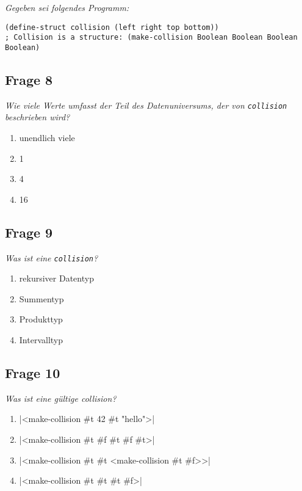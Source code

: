 \documentclass[a4paper, 11pt]{article}
\begin{document}
\begin{mdframed}
	\noindent\textit{Gegeben sei folgendes Programm:}
	\begin{verbatim}
(define-struct collision (left right top bottom))
; Collision is a structure: (make-collision Boolean Boolean Boolean Boolean)
\end{verbatim}

	\subsection*{Frage 8}
	\textit{Wie viele Werte umfasst der Teil des Datenuniversums, der von \texttt{collision} beschrieben wird?}
	\begin{enumerate}[label=$\square$]
		\item unendlich viele
		\item 1
		\item 4
		\item 16
	\end{enumerate}

	\subsection*{Frage 9}
	\textit{Was ist eine \texttt{collision}?}
	\begin{enumerate}[label=$\square$]
		\item rekursiver Datentyp
		\item Summentyp
		\item Produkttyp
		\item Intervalltyp
	\end{enumerate}

	\subsection*{Frage 10}
	\textit{Was ist eine gültige collision?}
	\begin{enumerate}[label=$\square$]
		\item {}|<make-collision #t 42 #t "hello">|
		\item {}|<make-collision #t #f #t #f #t>|
		\item {}|<make-collision #t #t <make-collision #t #f>>|
		\item {}|<make-collision #t #t #t #f>|
	\end{enumerate}


\end{mdframed}
\end{document}
